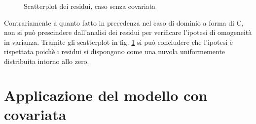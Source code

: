 \documentclass[a4paper,11pt,twoside,openright]{book}							%
\begin{document}
\begin{figure}[t]
	\centering
	\caption{Scatterplot dei residui, caso senza covariata}
	\label{fig:Ven_residui}
\end{figure}
Contrariamente a quanto fatto in precedenza nel caso di dominio a forma di C, non si può prescindere dall'analisi dei residui per verificare l'ipotesi di omogeneità in varianza. Tramite gli scatterplot in fig. \ref{fig:Ven_residui} si può concludere che l'ipotesi è rispettata poichè i residui si dispongono come una nuvola uniformemente distribuita intorno allo zero.


\section{Applicazione del modello con covariata}
\end{document}
